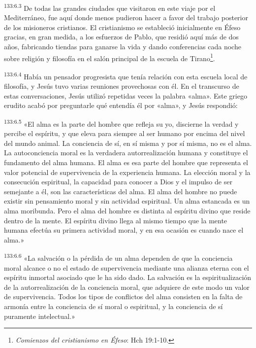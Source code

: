 \par
\textsuperscript{133:6.3} De todas las grandes ciudades que visitaron en este viaje por el Mediterráneo, fue aquí donde menos pudieron hacer a favor del trabajo posterior de los misioneros cristianos. El cristianismo se estableció inicialmente en Éfeso gracias, en gran medida, a los esfuerzos de Pablo, que residió aquí más de dos años, fabricando tiendas para ganarse la vida y dando conferencias cada noche sobre religión y filosofía en el salón principal de la escuela de Tirano\footnote{\textit{Comienzos del cristianismo en Éfeso}: Hch 19:1-10.}.

\par
\textsuperscript{133:6.4} Había un pensador progresista que tenía relación con esta escuela local de filosofía, y Jesús tuvo varias reuniones provechosas con él. En el transcurso de estas conversaciones, Jesús utilizó repetidas veces la palabra «alma». Este griego erudito acabó por preguntarle qué entendía él por «alma», y Jesús respondió:

\par
\textsuperscript{133:6.5} «El alma es la parte del hombre que refleja su yo, discierne la verdad y percibe el espíritu, y que eleva para siempre al ser humano por encima del nivel del mundo animal. La conciencia de sí, en sí misma y por sí misma, no es el alma. La autoconciencia moral es la verdadera autorrealización humana y constituye el fundamento del alma humana. El alma es esa parte del hombre que representa el valor potencial de supervivencia de la experiencia humana. La elección moral y la consecución espiritual, la capacidad para conocer a Dios y el impulso de ser semejante a él, son las características del alma. El alma del hombre no puede existir sin pensamiento moral y sin actividad espiritual. Un alma estancada es un alma moribunda. Pero el alma del hombre es distinta al espíritu divino que reside dentro de la mente. El espíritu divino llega al mismo tiempo que la mente humana efectúa su primera actividad moral, y en esa ocasión es cuando nace el alma.»

\par
\textsuperscript{133:6.6} «La salvación o la pérdida de un alma dependen de que la conciencia moral alcance o no el estado de supervivencia mediante una alianza eterna con el espíritu inmortal asociado que le ha sido dado. La salvación es la espiritualización de la autorrealización de la conciencia moral, que adquiere de este modo un valor de supervivencia. Todos los tipos de conflictos del alma consisten en la falta de armonía entre la conciencia de sí moral o espiritual, y la conciencia de sí puramente intelectual.»


